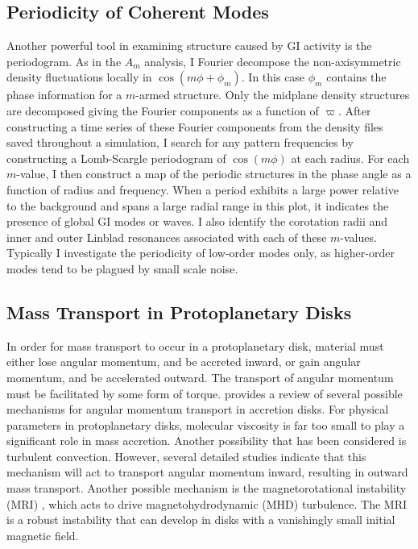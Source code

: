 \subsection{Periodicity of Coherent Modes}\label{sec:IC:periodogram}

Another powerful tool in examining structure caused by GI activity is the periodogram. As in the $A_m$ analysis, I Fourier decompose the non-axisymmetric density fluctuations locally in $\cos(m\phi + \phi_m)$. In this case $\phi_m$ contains the phase information for a $m$-armed structure. Only the midplane density structures are decomposed giving the Fourier components as a function of $\varpi$. After constructing a time series of these Fourier components from the density files saved throughout a simulation, I search for any pattern frequencies by constructing a Lomb-Scargle periodogram \citep{scargle1982,horne1986} of $\cos(m\phi)$ at each radius. For each $m$-value, I then construct a map of the periodic structures in the phase angle as a function of radius and frequency. When a period exhibits a large power relative to the background and spans a large radial range in this plot, it indicates the presence of global GI modes or waves. I also identify the corotation radii and inner and outer Linblad resonances associated with each of these $m$-values. Typically I investigate the periodicity of low-order modes only, as higher-order modes tend to be plagued by small scale noise.

\subsection{Mass Transport in Protoplanetary Disks}\label{sec:IC:masstransport}

In order for mass transport to occur in a protoplanetary disk, material must either lose angular momentum, and be accreted inward, or gain angular momentum, and be accelerated outward. The transport of angular momentum must be facilitated by some form of torque. \citet{hartmann1998a} provides a review of several possible mechanisms for angular momentum transport in accretion disks. For physical parameters in protoplanetary disks, molecular viscosity is far too small to play a significant role in mass accretion. Another possibility that has been considered is turbulent convection. However, several detailed studies \citep{ryu1992,cabot1992,stone1996} indicate that this mechanism will act to transport angular momentum inward, resulting in outward mass transport. Another possible mechanism is the magnetorotational instability (MRI) \citep{balbus1997}, which acts to drive magnetohydrodynamic (MHD) turbulence. The MRI is a robust instability that can develop in disks with a vanishingly small initial magnetic field.

